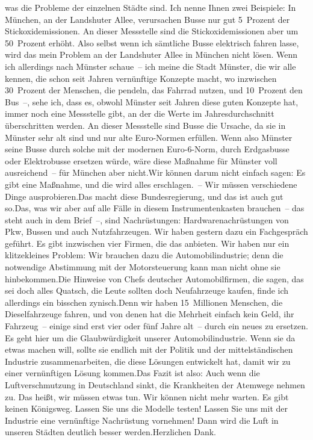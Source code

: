 \documentclass{article}
\begin{document}
was die Probleme der einzelnen Städte sind. Ich nenne Ihnen zwei Beispiele: In München, an der Landshuter Allee, verursachen Busse nur gut 5 Prozent der Stickoxidemissionen. An dieser Messstelle sind die Stickoxidemissionen aber um 50 Prozent erhöht. Also selbst wenn ich sämtliche Busse elektrisch fahren lasse, wird das mein Problem an der Landshuter Allee in München nicht lösen. Wenn ich allerdings nach Münster schaue – ich meine die Stadt Münster, die wir alle kennen, die schon seit Jahren vernünftige Konzepte macht, wo inzwischen 30 Prozent der Menschen, die pendeln, das Fahrrad nutzen, und 10 Prozent den Bus –, sehe ich, dass es, obwohl Münster seit Jahren diese guten Konzepte hat, immer noch eine Messstelle gibt, an der die Werte im Jahresdurchschnitt überschritten werden. An dieser Messstelle sind Busse die Ursache, da sie in Münster sehr alt sind und nur alte Euro-Normen erfüllen. Wenn also Münster seine Busse durch solche mit der modernen Euro-6-Norm, durch Erdgasbusse oder Elektrobusse ersetzen würde, wäre diese Maßnahme für Münster voll ausreichend – für München aber nicht.Wir können darum nicht einfach sagen: Es gibt eine Maßnahme, und die wird alles erschlagen. – Wir müssen verschiedene Dinge ausprobieren.Das macht diese Bundesregierung, und das ist auch gut so.Das, was wir aber auf alle Fälle in diesem Instrumentenkasten brauchen – das steht auch in dem Brief –, sind Nachrüstungen: Hardwarenachrüstungen von Pkw, Bussen und auch Nutzfahrzeugen. Wir haben gestern dazu ein Fachgespräch geführt. Es gibt inzwischen vier Firmen, die das anbieten. Wir haben nur ein klitzekleines Problem: Wir brauchen dazu die Automobilindustrie; denn die notwendige Abstimmung mit der Motorsteuerung kann man nicht ohne sie hinbekommen.Die Hinweise von Chefs deutscher Automobilfirmen, die sagen, das sei doch alles Quatsch, die Leute sollten doch Neufahrzeuge kaufen, finde ich allerdings ein bisschen zynisch.Denn wir haben 15 Millionen Menschen, die Dieselfahrzeuge fahren, und von denen hat die Mehrheit einfach kein Geld, ihr Fahrzeug – einige sind erst vier oder fünf Jahre alt – durch ein neues zu ersetzen. Es geht hier um die Glaubwürdigkeit unserer Automobilindustrie. Wenn sie da etwas machen will, sollte sie endlich mit der Politik und der mittelständischen Industrie zusammenarbeiten, die diese Lösungen entwickelt hat, damit wir zu einer vernünftigen Lösung kommen.Das Fazit ist also: Auch wenn die Luftverschmutzung in Deutschland sinkt, die Krankheiten der Atemwege nehmen zu. Das heißt, wir müssen etwas tun. Wir können nicht mehr warten. Es gibt keinen Königsweg. Lassen Sie uns die Modelle testen! Lassen Sie uns mit der Industrie eine vernünftige Nachrüstung vornehmen! Dann wird die Luft in unseren Städten deutlich besser werden.Herzlichen Dank.
\end{document}
